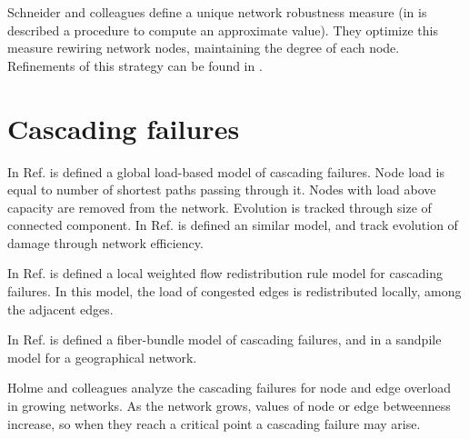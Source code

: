 \documentclass[12pt]{article}
\begin{document}
Schneider and colleagues \cite{Schneider2011} define a unique network robustness measure (in \cite{Hong2017} is described a procedure to compute an approximate value). They optimize this measure rewiring network nodes, maintaining the degree of each node. Refinements of this strategy can be found in \cite{Louzada2013, Yang2015, Zhou2014}.


\section{Cascading failures}

In Ref. \cite{Motter2002} is defined a global load-based model of cascading failures. Node load is equal to number of shortest paths passing through it. Nodes with load above capacity are removed from the network. Evolution is tracked through size of connected component. In Ref. \cite{Crucitti2004} is defined an similar model, and track evolution of damage through network efficiency. \medskip

In Ref. \cite{Wang2008} is defined a local weighted flow redistribution rule model for cascading failures. In this model, the load of congested edges is redistributed locally, among the adjacent edges.\medskip

In Ref. \cite{Moreno2002} is defined a fiber-bundle model of cascading failures, and in \cite{Huang2006} a sandpile model for a geographical network.\medskip

Holme and colleagues analyze the cascading failures for node \cite{Holme2002b} and edge \cite{Holme2002c} overload in growing networks. As the network grows, values of node or edge betweenness increase, so when they reach a critical point a cascading failure may arise.\medskip

\medskip

\nocite{*}



\end{document}

